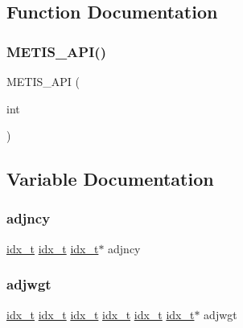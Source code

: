 \subsection{Function Documentation}
\mbox{\label{a00879_a57b80ef4a852110c44a76feb8238c2b4}} 
\subsubsection{\texorpdfstring{M\+E\+T\+I\+S\+\_\+\+A\+P\+I()}{METIS\_API()}}
{\footnotesize\ttfamily M\+E\+T\+I\+S\+\_\+\+A\+PI (\begin{DoxyParamCaption}\item[{int}]{ }\end{DoxyParamCaption})}



\subsection{Variable Documentation}
\mbox{\label{a00879_a20c068e3ebdd8f9889fb82c1f677d679}} 
\subsubsection{\texorpdfstring{adjncy}{adjncy}}
{\footnotesize\ttfamily \hyperlink{a00876_aaa5262be3e700770163401acb0150f52}{idx\+\_\+t} \hyperlink{a00876_aaa5262be3e700770163401acb0150f52}{idx\+\_\+t} \hyperlink{a00876_aaa5262be3e700770163401acb0150f52}{idx\+\_\+t}$\ast$ adjncy}

\mbox{\label{a00879_a2be4719baa820cfa5c06fd070796e0d3}} 
\subsubsection{\texorpdfstring{adjwgt}{adjwgt}}
{\footnotesize\ttfamily \hyperlink{a00876_aaa5262be3e700770163401acb0150f52}{idx\+\_\+t} \hyperlink{a00876_aaa5262be3e700770163401acb0150f52}{idx\+\_\+t} \hyperlink{a00876_aaa5262be3e700770163401acb0150f52}{idx\+\_\+t} \hyperlink{a00876_aaa5262be3e700770163401acb0150f52}{idx\+\_\+t} \hyperlink{a00876_aaa5262be3e700770163401acb0150f52}{idx\+\_\+t} \hyperlink{a00876_aaa5262be3e700770163401acb0150f52}{idx\+\_\+t}$\ast$ adjwgt}

